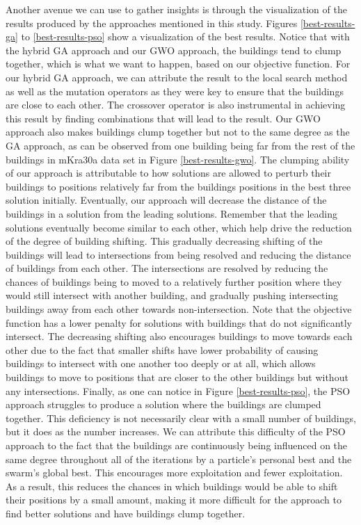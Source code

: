 Another avenue we can use to gather insights is through the visualization of the results produced by the approaches mentioned in this study. Figures \ref{best-results-ga} to \ref{best-results-pso} show a visualization of the best results. Notice that with the hybrid GA approach and our GWO approach, the buildings tend to clump together, which is what we want to happen, based on our objective function. For our hybrid GA approach, we can attribute the result to the local search method as well as the mutation operators as they were key to ensure that the buildings are close to each other. The crossover operator is also instrumental in achieving this result by finding combinations that will lead to the result. Our GWO approach also makes buildings clump together but not to the same degree as the GA approach, as can be observed from one building being far from the rest of the buildings in mKra30a data set in Figure \ref{best-results-gwo}. The clumping ability of our approach is attributable to how solutions are allowed to perturb their buildings to positions relatively far from the buildings positions in the best three solution initially. Eventually, our approach will decrease the distance of the buildings in a solution from the leading solutions. Remember that the leading solutions eventually become similar to each other, which help drive the reduction of the degree of building shifting. This gradually decreasing shifting of the buildings will lead to intersections from being resolved and reducing the distance of buildings from each other. The intersections are resolved by reducing the chances of buildings being to moved to a relatively further position where they would still intersect with another building, and gradually pushing intersecting buildings away from each other towards non-intersection. Note that the objective function has a lower penalty for solutions with buildings that do not significantly intersect. The decreasing shifting also encourages buildings to move towards each other due to the fact that smaller shifts have lower probability of causing buildings to intersect with one another too deeply or at all, which allows buildings to move to positions that are closer to the other buildings but without any intersections. Finally, as one can notice in Figure \ref{best-results-pso}, the PSO approach struggles to produce a solution where the buildings are clumped together. This deficiency is not necessarily clear with a small number of buildings, but it does as the number increases. We can attribute this difficulty of the PSO approach to the fact that the buildings are continuously being influenced on the same degree throughout all of the iterations by a particle's personal best and the swarm's global best. This encourages more exploitation and fewer exploitation. As a result, this reduces the chances in which buildings would be able to shift their positions by a small amount, making it more difficult for the approach to find better solutions and have buildings clump together.

